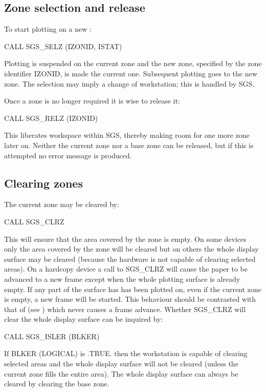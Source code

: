 \documentclass[11pt]{starlink}
\begin{document}
\subsection {\label{zsel}Zone selection and release}

To start plotting on a new :
\begin{terminalv}
CALL SGS_SELZ (IZONID, ISTAT)
\end{terminalv}
Plotting is suspended on the current zone and the new
zone, specified by the zone identifier IZONID, is made
the current one.  Subsequent plotting goes to the new
zone.  The selection may imply a change of workstation;  this is
handled by SGS.

Once a zone is no longer required it is wise to release it:
\begin{terminalv}
CALL SGS_RELZ (IZONID)
\end{terminalv}
This liberates workspace within SGS, thereby making
room for one more zone later on.  Neither the current zone nor a base zone
can be released, but if this is attempted no error message is produced.

\subsection {Clearing zones}

The current zone may be cleared by:
\begin{terminalv}
CALL SGS_CLRZ
\end{terminalv}
This will ensure that the area covered by the zone is empty.  On some devices
only the area covered by the zone will be cleared but on others the whole
display surface may be cleared (because the hardware is
not capable of clearing selected
areas).  On a hardcopy device a call to SGS\_CLRZ will cause the paper to
be advanced to a new
frame except when the whole plotting surface is already empty.  If any part of
the surface has has been plotted on, even if the current zone is empty, a new
frame will be started.  This behaviour should be contrasted with
that of  (see
) which
never causes a frame advance.  Whether SGS\_CLRZ will clear the whole display
surface can be inquired by:
\begin{terminalv}
CALL SGS_ISLER (BLKER)
\end{terminalv}
If BLKER (LOGICAL) is .TRUE. then the workstation is capable of
clearing selected areas and the whole display surface will not be cleared
(unless the current zone fills
the entire area).  The whole display surface can always be cleared by
clearing the base zone.
\end{document}
